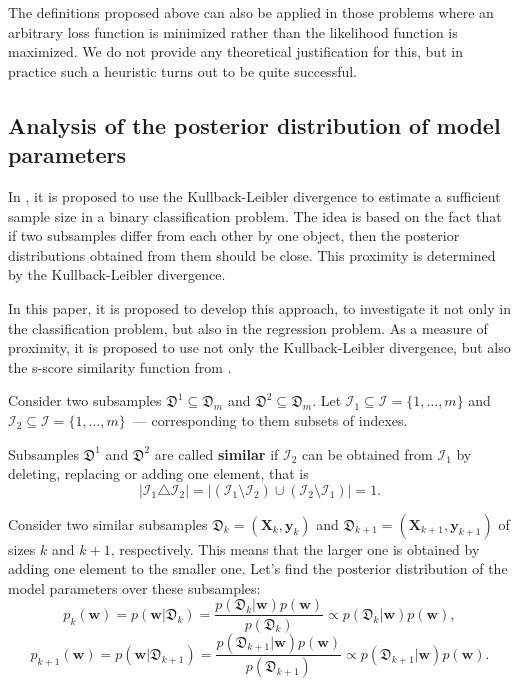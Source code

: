 \documentclass[
11pt,%
tightenlines,%
twoside,%
onecolumn,%
nofloats,%
nobibnotes,%
nofootinbib,%
superscriptaddress,%
noshowpacs,%
centertags]%
{revtex4-2}
\begin{document}
The definitions proposed above can also be applied in those problems where an arbitrary loss function is minimized rather than the likelihood function is maximized. We do not provide any theoretical justification for this, but in practice such a heuristic turns out to be quite successful.

\subsection{Analysis of the posterior distribution of model parameters}

In \citep{MOTRENKO2014743}, it is proposed to use the Kullback-Leibler divergence to estimate a sufficient sample size in a binary classification problem. The idea is based on the fact that if two subsamples differ from each other by one object, then the posterior distributions obtained from them should be close. This proximity is determined by the Kullback-Leibler divergence. 

In this paper, it is proposed to develop this approach, to investigate it not only in the classification problem, but also in the regression problem. As a measure of proximity, it is proposed to use not only the Kullback-Leibler divergence, but also the s-score similarity function from \citep{Aduenko2017}.

Consider two subsamples $\mathfrak{D}^1\subseteq\mathfrak{D}_m$ and $\mathfrak{D}^2\subseteq\mathfrak{D}_m$. Let $\mathcal{I}_1 \subseteq \mathcal{I} = \{1, \ldots, m\}$ and $\mathcal{I}_2 \subseteq \mathcal{I} =\{1, \ldots,m\}$~--- corresponding to them subsets of indexes.

\begin{definition}
    Subsamples $\mathfrak{D}^1$ and $\mathfrak{D}^2$ are called \textbf{similar} if $\mathcal{I}_2$ can be obtained from $\mathcal{I}_1$ by deleting, replacing or adding one element, that is
    \[ \left| \mathcal{I}_1 \triangle \mathcal{I}_2 \right| = \left| \left( \mathcal{I}_1 \setminus \mathcal{I}_2 \right) \cup \left( \mathcal{I}_2 \setminus \mathcal{I}_1 \right) \right| = 1. \]
\end{definition}

Consider two similar subsamples $\mathfrak{D}_k = (\mathbf{X}_k,\mathbf{y}_k)$ and $\mathfrak{D}_{k+1} = (\mathbf{X}_{k+1}, \mathbf{y}_{k+1})$ of sizes $k$ and $k+1$, respectively. This means that the larger one is obtained by adding one element to the smaller one. Let's find the posterior distribution of the model parameters over these subsamples:
\[p_k(\mathbf{w}) = p(\mathbf{w} | \mathfrak{D}_k) = \dfrac{p(\mathfrak{D}_k | \mathbf{w}) p(\mathbf{w})}{p(\mathfrak{D}_k)} \propto p(\mathfrak{D}_k | \mathbf{w}) p(\mathbf{w}), \]
\[ p_{k+1}(\mathbf{w}) = p(\mathbf{w} | \mathfrak{D}_{k+1}) = \dfrac{p(\mathfrak{D}_{k+1} | \mathbf{w}) p(\mathbf{w})}{p(\mathfrak{D}_{k+1})} \propto p(\mathfrak{D}_{k+1} | \mathbf{w}) p(\mathbf{w}). \]
\end{document}
